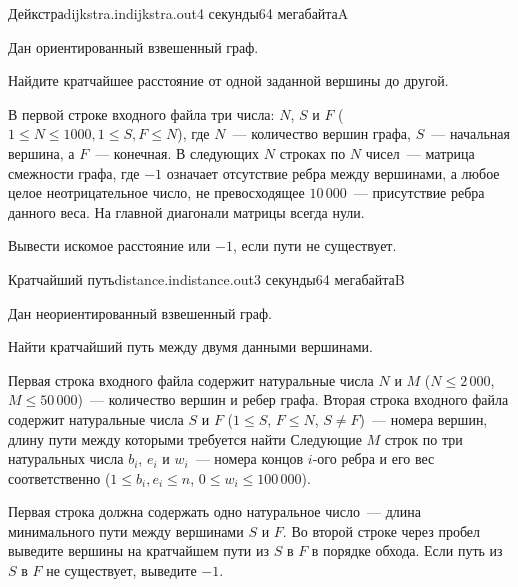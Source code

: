 \documentclass[12pt,a4paper,oneside,twocolumn,landscape]{article}
\begin{document}
\raggedbottom

\begin{problem}{Дейкстра}{dijkstra.in}{dijkstra.out}{4 секунды}{64 мегабайта}{A}



Дан ориентированный взвешенный граф.

Найдите кратчайшее расстояние от одной заданной вершины до другой.

\InputFile
В первой строке входного файла три числа: $N$, $S$ и $F$ (${1 \leqslant N \leqslant 1000}, {1 \leqslant S, F \leqslant N}$), где $N$~--- количество вершин графа, $S$~--- начальная вершина, а $F$~--- конечная. 
В следующих $N$ строках по $N$ чисел~--- матрица смежности графа, где
$-1$ означает отсутствие ребра между вершинами, а любое целое неотрицательное число, не превосходящее $10\,000$~--- присутствие ребра данного веса. На
главной диагонали матрицы всегда нули.

\OutputFile
Вывести искомое расстояние или $-1$, если пути не существует.


\Example

\begin{example}
%
\end{example}


\end{problem}

\bigskip\bigskip
\begin{problem}{Кратчайший путь}{distance.in}{distance.out}{3 секунды}{64 мегабайта}{B}



Дан неориентированный взвешенный граф.

Найти кратчайший путь между двумя данными вершинами.

\InputFile
Первая строка входного файла содержит натуральные числа $N$ и $M$ ({$N \leqslant 2\,000$}, $M \leqslant 50\,000$)~---
количество вершин и ребер графа.
Вторая строка входного файла содержит натуральные числа $S$ и $F$ ($1 \leqslant S$, $F \leqslant N$, $S \ne F$)~---
номера вершин, длину пути между которыми требуется найти
Следующие $M$ строк по три натуральных числа $b_i$, $e_i$ и $w_i$~--- номера 
концов $i$-ого ребра и его вес соответственно ($1 \leqslant b_i, e_i \leqslant n$, $0 \leqslant w_i \leqslant 100\,000$).

\OutputFile
Первая строка должна содержать одно натуральное число~--- 
длина минимального пути между вершинами $S$ и $F$. Во второй строке через пробел выведите вершины на кратчайшем пути из $S$ в $F$ в порядке обхода.
Если путь из $S$ в $F$ не существует, выведите $-1$.



\Example

\begin{example}
%
\end{example}


\end{problem}
\end{document}
